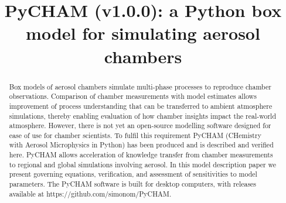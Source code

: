 \documentclass[gmd, manuscript]{copernicus}
\begin{document}
\title{PyCHAM (v1.0.0): a Python box model for simulating aerosol chambers}















\received{}
\pubdiscuss{} %
\revised{}
\accepted{}
\published{}




\maketitle



\begin{abstract}
Box models of aerosol chambers simulate multi-phase processes to reproduce chamber observations.  Comparison of chamber measurements with model estimates allows improvement of process understanding that can be transferred to ambient atmosphere simulations, thereby enabling evaluation of how chamber insights impact the real-world atmosphere.  However, there is not yet an open-source modelling software designed for ease of use for chamber scientists.  To fulfil this requirement PyCHAM (CHemistry with Aerosol Microphysics in Python) has been produced and is described and verified here.  PyCHAM allows acceleration of knowledge transfer from chamber measurements to regional and global simulations involving aerosol.  In this model description paper we present governing equations, verification, and assessment of sensitivities to model parameters.  The PyCHAM software is built for desktop computers, with releases available at https://github.com/simonom/PyCHAM.

\end{abstract}
\end{document}
